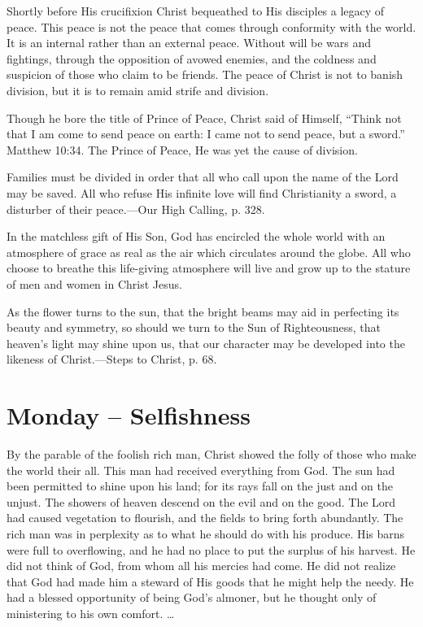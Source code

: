 \documentclass[a4paper, 10pt, twoside, headings=small]{scrartcl}
\begin{document}
\begin{multicols}{2}
Shortly before His crucifixion Christ bequeathed to His disciples a legacy of peace. This peace is not the peace that comes through conformity with the world. It is an internal rather than an external peace. Without will be wars and fightings, through the opposition of avowed enemies, and the coldness and suspicion of those who claim to be friends. The peace of Christ is not to banish division, but it is to remain amid strife and division.

Though he bore the title of Prince of Peace, Christ said of Himself, “Think not that I am come to send peace on earth: I came not to send peace, but a sword.” Matthew 10:34. The Prince of Peace, He was yet the cause of division.

Families must be divided in order that all who call upon the name of the Lord may be saved. All who refuse His infinite love will find Christianity a sword, a disturber of their peace.—Our High Calling, p. 328.

In the matchless gift of His Son, God has encircled the whole world with an atmosphere of grace as real as the air which circulates around the globe. All who choose to breathe this life-giving atmosphere will live and grow up to the stature of men and women in Christ Jesus.

As the flower turns to the sun, that the bright beams may aid in perfecting its beauty and symmetry, so should we turn to the Sun of Righteousness, that heaven’s light may shine upon us, that our character may be developed into the likeness of Christ.—Steps to Christ, p. 68.

\section*{Monday – Selfishness}

By the parable of the foolish rich man, Christ showed the folly of those who make the world their all. This man had received everything from God. The sun had been permitted to shine upon his land; for its rays fall on the just and on the unjust. The showers of heaven descend on the evil and on the good. The Lord had caused vegetation to flourish, and the fields to bring forth abundantly. The rich man was in perplexity as to what he should do with his produce. His barns were full to overflowing, and he had no place to put the surplus of his harvest. He did not think of God, from whom all his mercies had come. He did not realize that God had made him a steward of His goods that he might help the needy. He had a blessed opportunity of being God’s almoner, but he thought only of ministering to his own comfort. …


\end{multicols}
\end{document}
